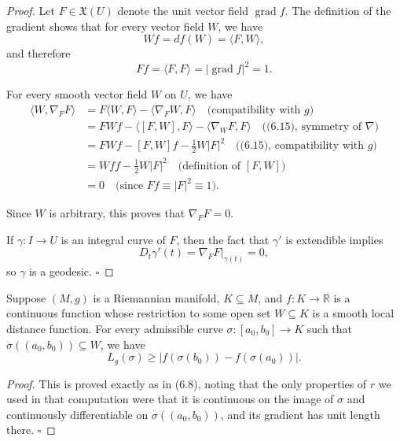 \begin{proof}
Let $F \in \mathfrak{X}(U)$ denote the unit vector field $\operatorname{grad} f$. The definition of the gradient shows that for every vector field $W$, we have
\begin{equation}
Wf = df(W) = \langle F, W \rangle, \tag{6.15}
\end{equation}
and therefore
\begin{equation}
Ff = \langle F, F \rangle = |\operatorname{grad} f|^2 = 1. \tag{6.16}
\end{equation}

For every smooth vector field $W$ on $U$, we have
\begin{align*}
\langle W, \nabla_F F \rangle &= F\langle W, F \rangle - \langle \nabla_F W, F \rangle \quad \text{(compatibility with $g$)} \\
&= FWf - \langle [F, W], F \rangle - \langle \nabla_W F, F \rangle \quad \text{((6.15), symmetry of $\nabla$)} \\
&= FWf - [F, W]f - \tfrac{1}{2}W|F|^2 \quad \text{((6.15), compatibility with $g$)} \\
&= Wff - \tfrac{1}{2}W|F|^2 \quad \text{(definition of $[F, W]$)} \\
&= 0 \quad \text{(since $Ff \equiv |F|^2 \equiv 1$)}.
\end{align*}

Since $W$ is arbitrary, this proves that $\nabla_F F = 0$.

If $\gamma : I \to U$ is an integral curve of $F$, then the fact that $\gamma'$ is extendible implies
\[
D_t \gamma'(t) = \nabla_F F|_{\gamma(t)} = 0,
\]
so $\gamma$ is a geodesic. $\square$
\end{proof}

\begin{lemma}
\label{lem:local-distance-curve-arc-length}

Suppose $(M, g)$ is a Riemannian manifold, $K \subseteq M$, and $f : K \to \mathbb{R}$ is a continuous function whose restriction to some open set $W \subseteq K$ is a smooth local distance function. For every admissible curve $\sigma : [a_0, b_0] \to K$ such that $\sigma((a_0, b_0)) \subseteq W$, we have
\[
L_g(\sigma) \geq |f(\sigma(b_0)) - f(\sigma(a_0))|.
\]
\end{lemma}

\begin{proof}
This is proved exactly as in (6.8), noting that the only properties of $r$ we used in that computation were that it is continuous on the image of $\sigma$ and continuously differentiable on $\sigma((a_0, b_0))$, and its gradient has unit length there. $\square$
\end{proof}

